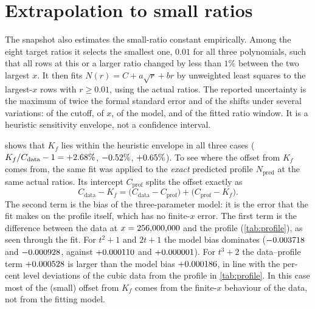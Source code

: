 \section{Extrapolation to small ratios}\label{sec:extrapolation}

The snapshot also estimates the small-ratio constant empirically. Among the eight target ratios it selects the smallest one, $0.01$ for all three polynomials, such that all rows at this or a larger ratio changed by less than $1\%$ between the two largest $x$. It then fits $N(r)=C+a\sqrt r+br$ by unweighted least squares to the largest-$x$ rows with $r\ge0.01$, using the actual ratios. The reported uncertainty is the maximum of twice the formal standard error and of the shifts under several variations: of the cutoff, of $x$, of the model, and of the fitted ratio window. It is a heuristic sensitivity envelope, not a confidence interval.

\begin{table}[ht]
\centering
\small\setlength{\tabcolsep}{4.5pt}

\caption{The snapshot's extrapolation $C_{\mathrm{data}}$ with its heuristic envelope; the same fit applied to the exact profile $N_{\mathrm{pred}}$ at the same actual ratios ($C_{\mathrm{prof}}$); the constant $K_f$; and the decomposition $C_{\mathrm{data}}-K_f=(C_{\mathrm{data}}-C_{\mathrm{prof}})+(C_{\mathrm{prof}}-K_f)$.}\label{tab:extrapolation}
\end{table}

 shows that $K_f$ lies within the heuristic envelope in all three cases ($K_f/C_{\mathrm{data}}-1=+2.68\%$, $-0.52\%$, $+0.65\%$). To see where the offset from $K_f$ comes from, the same fit was applied to the \emph{exact} predicted profile $N_{\mathrm{pred}}$ at the same actual ratios. Its intercept $C_{\mathrm{prof}}$ splits the offset exactly as
\[
C_{\mathrm{data}}-K_f=\bigl(C_{\mathrm{data}}-C_{\mathrm{prof}}\bigr)+\bigl(C_{\mathrm{prof}}-K_f\bigr).
\]
The second term is the bias of the three-parameter model: it is the error that the fit makes on the profile itself, which has no finite-$x$ error. The first term is the difference between the data at $x=256{,}000{,}000$ and the profile (\cref{tab:profile}), as seen through the fit. For $t^2+1$ and $2t+1$ the model bias dominates ($-0.003718$ and $-0.000928$, against $+0.000110$ and $+0.000001$). For $t^3+2$ the data--profile term $+0.000528$ is larger than the model bias $+0.000186$, in line with the per-cent level deviations of the cubic data from the profile in \cref{tab:profile}. In this case most of the (small) offset from $K_f$ comes from the finite-$x$ behaviour of the data, not from the fitting model.

